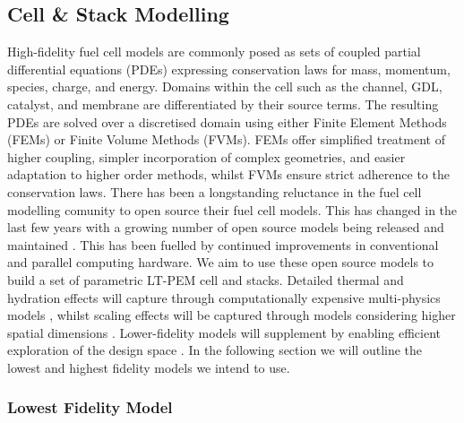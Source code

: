 \subsection{Cell \& Stack Modelling}
High-fidelity fuel cell models are commonly posed as sets of coupled partial differential equations (PDEs) expressing conservation laws for mass, momentum, species, charge, and energy.
Domains within the cell such as the channel, GDL, catalyst, and membrane are differentiated by their source terms. The resulting PDEs are solved over a discretised domain using either Finite Element Methods (FEMs) or Finite Volume Methods (FVMs).
FEMs offer simplified treatment of higher coupling, simpler incorporation of complex geometries, and easier adaptation to higher order methods, whilst FVMs ensure strict adherence to the conservation laws.
There has been a longstanding reluctance in the fuel cell modelling comunity to open source their fuel cell models.
This has changed in the last few years with a growing number of open source models being released and maintained \cite{vetterFreeOpenReference2019, secanellOpenFCSTOpenSourceMathematical2014, zhangOpenFuelCell2NewComputational2024,  koneOpenSourceToolboxPEM2018, gassAlphaPEMOpensourceDynamic2025}.
This has been fuelled by continued improvements in conventional and parallel computing hardware.
We aim to use these open source models to build a set of parametric LT-PEM cell and stacks.
Detailed thermal and hydration effects will capture through computationally expensive multi-physics models \cite{secanellOpenFCSTOpenSourceMathematical2014, zhangOpenFuelCell2NewComputational2024, vetterFreeOpenReference2019}, whilst scaling effects will be captured through models considering higher spatial dimensions \cite{secanellOpenFCSTOpenSourceMathematical2014, zhangOpenFuelCell2NewComputational2024, koneOpenSourceToolboxPEM2018}.
Lower-fidelity models will supplement by enabling efficient exploration of the design space \cite{kulikovskyPhysicallyBasedAnalytical2013a, ohayreFuelCellFundamentals2016, larminieFuelCellSystems2003}. In the following section we will outline the lowest and highest fidelity models we intend to use.

\subsubsection{Lowest Fidelity Model}

